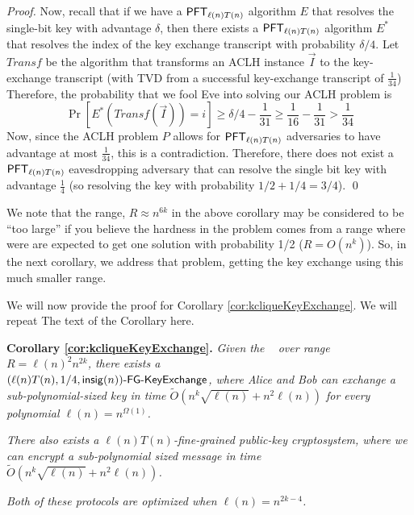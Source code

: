 \begin{proof}
	Now, recall that if we have a $\mathsf{PFT}_{\ell(n)T(n)}$ algorithm $E$ that resolves the single-bit key with advantage $\delta$, then there exists a $\mathsf{PFT}_{\ell(n) T(n)}$ algorithm $E^*$ that resolves the index of the key exchange transcript with probability $\delta/4$. Let $Transf$ be the algorithm that transforms an ACLH instance $\vec I$ to the key-exchange transcript (with TVD from a successful key-exchange transcript of $\frac 1 {34}$) Therefore, the probability that we fool Eve into solving our ACLH problem is
	\[ \Pr[ E^*(Transf(\vec I)) = i ] \ge \delta/4 - \frac 1{31} \ge \frac{1}{16} - \frac 1 {31} > \frac 1 {34} \]
	Now, since the ACLH problem $P$ allows for $\mathsf{PFT}_{\ell(n)T(n)}$ adversaries to have advantage at most $\frac 1 {34}$, this is a contradiction. Therefore, there does not exist a $\mathsf{PFT}_{\ell(n)T(n)}$ eavesdropping adversary that can resolve the single bit key with advantage $\frac 1 4$ (so resolving the key with probability $1/2 + 1/4 = 3/4$).
	\qed
\end{proof}

We note that the range, $R \approx n^{6k}$ in the above corollary may be considered to be ``too large'' if you believe the hardness in the problem comes from a range where were are expected to get one solution with probability 1/2 ($R = O(n^k)$). So, in the next corollary, we address that problem, getting the key exchange using this much smaller range.

We will now provide the proof for Corollary \ref{cor:kcliqueKeyExchange}. We will repeat The text of the Corollary here. 

\textbf{Corollary \ref{cor:kcliqueKeyExchange}.}
\emph{	Given the \strongzkc~ over range $R = \ell(n)^2 n^{2k}$, there exists a\\ $(\ell(n)T(n), 1/4, \mathsf{insig}(n))\textsf{-FG-KeyExchange}$, where Alice and Bob can exchange a sub-polynomial-sized key in time $\tilde{O}\left(n^{k}\sqrt{\ell(n)} + n^2\ell(n)\right)$ for every polynomial $\ell(n)= n ^{\Omega(1)}$.}
	
\emph{	There also exists a $\ell(n)T(n)$-fine-grained public-key cryptosystem, where we can encrypt a sub-polynomial sized message in time $\tilde{O}\left(n^{k}\sqrt{\ell(n)} + n^2\ell(n)\right)$.}
	
\emph{	Both of these protocols are optimized when $\ell(n) = n^{2k-4}$.}
	

